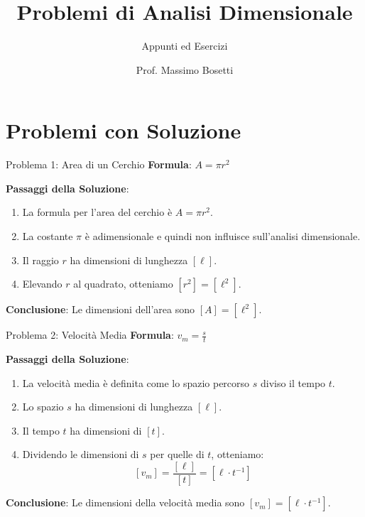 \documentclass{beamer}
\title{Problemi di Analisi Dimensionale}
\subtitle{Appunti ed Esercizi} %
\author{Prof. Massimo Bosetti}
\institute{Liceo da Vinci}
\date{}
\begin{document}
\begin{frame}
    \titlepage
\end{frame}

\section{Problemi con Soluzione}

\begin{frame}{Problema 1: Area di un Cerchio}
    \textbf{Formula}: \( A = \pi r^2 \)
    
    \textbf{Passaggi della Soluzione}:
    \begin{enumerate}
        \item La formula per l'area del cerchio è \( A = \pi r^2 \).
        \item La costante \(\pi\) è adimensionale e quindi non influisce sull'analisi dimensionale.
        \item Il raggio \(r\) ha dimensioni di lunghezza \([\ell]\).
        \item Elevando \(r\) al quadrato, otteniamo \([r^2] = [\ell^2]\).
    \end{enumerate}
    \textbf{Conclusione}: Le dimensioni dell'area sono \([A] = [\ell^2]\).
\end{frame}

\begin{frame}{Problema 2: Velocità Media}
    \textbf{Formula}: \( v_m = \frac{s}{t} \)
    
    \textbf{Passaggi della Soluzione}:
    \begin{enumerate}
        \item La velocità media è definita come lo spazio percorso \(s\) diviso il tempo \(t\).
        \item Lo spazio \(s\) ha dimensioni di lunghezza \([\ell]\).
        \item Il tempo \(t\) ha dimensioni di \([t]\).
        \item Dividendo le dimensioni di \(s\) per quelle di \(t\), otteniamo:
        \[
        [v_m] = \frac{[\ell]}{[t]} = [\ell \cdot t^{-1}]
        \]
    \end{enumerate}
    \textbf{Conclusione}: Le dimensioni della velocità media sono \([v_m] = [\ell \cdot t^{-1}]\).
\end{frame}
\end{document}
